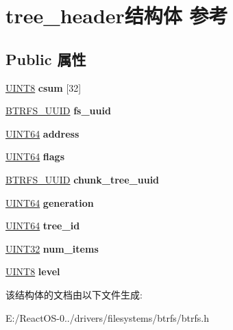 \hypertarget{structtree__header}{}\section{tree\+\_\+header结构体 参考}
\label{structtree__header}
\subsection*{Public 属性}
\begin{DoxyCompactItemize}
\item 
\mbox{\label{structtree__header_a367d9b2c8a4508400da6a815a71d629e}} 
\hyperlink{_processor_bind_8h_ab27e9918b538ce9d8ca692479b375b6a}{U\+I\+N\+T8} {\bfseries csum} \mbox{[}32\mbox{]}
\item 
\mbox{\label{structtree__header_a81d1249722c6559af3e476be79170294}} 
\hyperlink{struct_b_t_r_f_s___u_u_i_d}{B\+T\+R\+F\+S\+\_\+\+U\+U\+ID} {\bfseries fs\+\_\+uuid}
\item 
\mbox{\label{structtree__header_a7bcedd4566e325c2de24575433082d51}} 
\hyperlink{_processor_bind_8h_a57be03562867144161c1bfee95ca8f7c}{U\+I\+N\+T64} {\bfseries address}
\item 
\mbox{\label{structtree__header_a60068836e8a68a3d6d94691233b16714}} 
\hyperlink{_processor_bind_8h_a57be03562867144161c1bfee95ca8f7c}{U\+I\+N\+T64} {\bfseries flags}
\item 
\mbox{\label{structtree__header_a0163d7bbfd80500a333cda00149a9274}} 
\hyperlink{struct_b_t_r_f_s___u_u_i_d}{B\+T\+R\+F\+S\+\_\+\+U\+U\+ID} {\bfseries chunk\+\_\+tree\+\_\+uuid}
\item 
\mbox{\label{structtree__header_a8674813cae0ea0becd630375bb94fd15}} 
\hyperlink{_processor_bind_8h_a57be03562867144161c1bfee95ca8f7c}{U\+I\+N\+T64} {\bfseries generation}
\item 
\mbox{\label{structtree__header_a72a6e94f7afb94c2e0b9d1f55dd941e3}} 
\hyperlink{_processor_bind_8h_a57be03562867144161c1bfee95ca8f7c}{U\+I\+N\+T64} {\bfseries tree\+\_\+id}
\item 
\mbox{\label{structtree__header_aa4b8ed8b89e36c712c4a0e0f217a86eb}} 
\hyperlink{_processor_bind_8h_ae1e6edbbc26d6fbc71a90190d0266018}{U\+I\+N\+T32} {\bfseries num\+\_\+items}
\item 
\mbox{\label{structtree__header_a16855333c88f31525e51ee264089526d}} 
\hyperlink{_processor_bind_8h_ab27e9918b538ce9d8ca692479b375b6a}{U\+I\+N\+T8} {\bfseries level}
\end{DoxyCompactItemize}


该结构体的文档由以下文件生成\+:\begin{DoxyCompactItemize}
\item 
E\+:/\+React\+O\+S-\/0../drivers/filesystems/btrfs/btrfs.\+h\end{DoxyCompactItemize}
